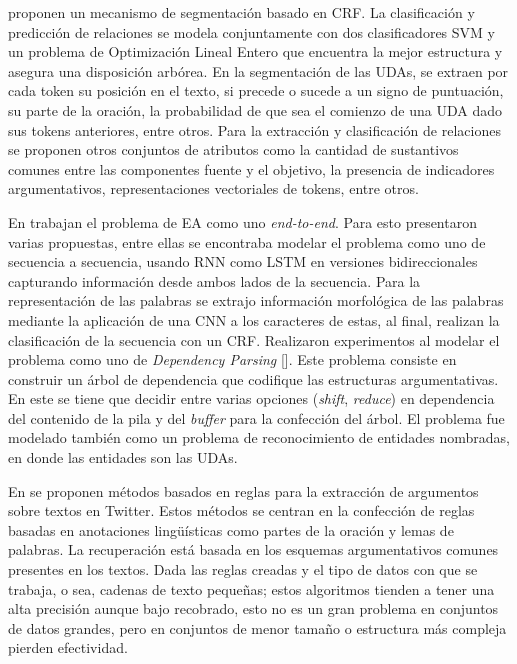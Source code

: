 \textcite{stab2017parsing} proponen un mecanismo de segmentación basado en CRF. La clasificación
y predicción de relaciones se modela conjuntamente con dos clasificadores SVM y un problema
de Optimización Lineal Entero que encuentra la mejor estructura y asegura una disposición arbórea. En la segmentación
de las UDAs, se extraen por cada token su posición en el texto, si precede o sucede a un signo de puntuación, su parte de
la oración, la probabilidad de que sea el comienzo de una UDA dado sus tokens anteriores, entre otros. Para la extracción
y clasificación de relaciones se proponen otros conjuntos de atributos como la cantidad de sustantivos comunes entre
las componentes fuente y el objetivo, la presencia de indicadores argumentativos, representaciones vectoriales de tokens,
entre otros.

En \textcite{eger2017neural} trabajan el problema de EA como uno \emph{end-to-end}. 
Para esto presentaron varias propuestas, entre ellas se encontraba
modelar el problema como uno de secuencia a secuencia, usando RNN como 
LSTM en versiones bidireccionales capturando información desde ambos lados de la secuencia.
Para la representación de las palabras se extrajo información morfológica de las palabras mediante 
la aplicación de una CNN a los caracteres de estas,
al final, realizan la clasificación de la secuencia con un CRF. 
Realizaron experimentos al modelar el problema como uno de \emph{Dependency Parsing} [\cite{kiperwasser2016simple}]. Este problema
consiste en construir un árbol de dependencia que codifique las estructuras argumentativas. En este 
se tiene que decidir entre varias opciones (\emph{shift}, \emph{reduce}) en dependencia del contenido de la pila y del \emph{buffer}
para la confección del árbol.
El problema fue modelado también como un problema de reconocimiento de entidades nombradas, en donde las entidades son las UDAs.

En \textcite{dykes2020reconstructing} se proponen métodos basados en reglas para la extracción de argumentos sobre
textos en Twitter. Estos métodos se centran en la confección de reglas basadas en anotaciones lingüísticas como
partes de la oración y lemas de palabras. La recuperación está basada en los esquemas argumentativos comunes presentes
en los textos. Dada las reglas creadas y el tipo
de datos con que se trabaja, o sea, cadenas de texto pequeñas; estos algoritmos tienden a tener una alta precisión aunque 
bajo recobrado, esto no es un gran problema en conjuntos de datos grandes, pero en conjuntos de menor tamaño o estructura 
más compleja pierden efectividad.

